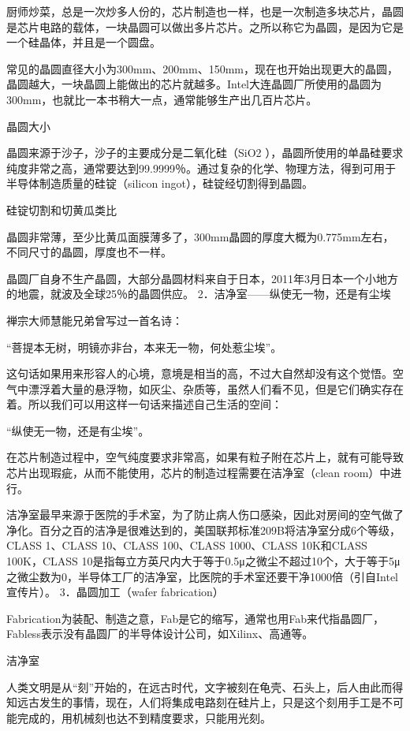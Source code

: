 \documentclass[12pt,UTF8]{ctexbook}
\begin{document}
厨师炒菜，总是一次炒多人份的，芯片制造也一样，也是一次制造多块芯片，晶圆是芯片电路的载体，一块晶圆可以做出多片芯片。之所以称它为晶圆，是因为它是一个硅晶体，并且是一个圆盘。

常见的晶圆直径大小为300mm、200mm、150mm，现在也开始出现更大的晶圆，晶圆越大，一块晶圆上能做出的芯片就越多。Intel大连晶圆厂所使用的晶圆为300mm，也就比一本书稍大一点，通常能够生产出几百片芯片。

晶圆大小

晶圆来源于沙子，沙子的主要成分是二氧化硅（SiO2 ），晶圆所使用的单晶硅要求纯度非常之高，通常要达到99.9999％。通过复杂的化学、物理方法，得到可用于半导体制造质量的硅锭（silicon ingot），硅锭经切割得到晶圆。

硅锭切割和切黄瓜类比

晶圆非常薄，至少比黄瓜面膜薄多了，300mm晶圆的厚度大概为0.775mm左右，不同尺寸的晶圆，厚度也不一样。

晶圆厂自身不生产晶圆，大部分晶圆材料来自于日本，2011年3月日本一个小地方的地震，就波及全球25％的晶圆供应。
2．洁净室——纵使无一物，还是有尘埃

禅宗大师慧能兄弟曾写过一首名诗：

“菩提本无树，明镜亦非台，本来无一物，何处惹尘埃”。

这句话如果用来形容人的心境，意境是相当的高，不过大自然却没有这个觉悟。空气中漂浮着大量的悬浮物，如灰尘、杂质等，虽然人们看不见，但是它们确实存在着。所以我们可以用这样一句话来描述自己生活的空间：

“纵使无一物，还是有尘埃”。

在芯片制造过程中，空气纯度要求非常高，如果有粒子附在芯片上，就有可能导致芯片出现瑕疵，从而不能使用，芯片的制造过程需要在洁净室（clean room）中进行。

洁净室最早来源于医院的手术室，为了防止病人伤口感染，因此对房间的空气做了净化。百分之百的洁净是很难达到的，美国联邦标准209B将洁净室分成6个等级，CLASS 1、CLASS 10、CLASS 100、CLASS 1000、CLASS 10K和CLASS 100K，CLASS 10是指每立方英尺内大于等于0.5μ之微尘不超过10个，大于等于5μ之微尘数为0，半导体工厂的洁净室，比医院的手术室还要干净1000倍（引自Intel宣传片）。
3．晶圆加工（wafer fabrication）

Fabrication为装配、制造之意，Fab是它的缩写，通常也用Fab来代指晶圆厂，Fabless表示没有晶圆厂的半导体设计公司，如Xilinx、高通等。

洁净室

人类文明是从“刻”开始的，在远古时代，文字被刻在龟壳、石头上，后人由此而得知远古发生的事情，现在，人们将集成电路刻在硅片上，只是这个刻用手工是不可能完成的，用机械刻也达不到精度要求，只能用光刻。
\end{document}
